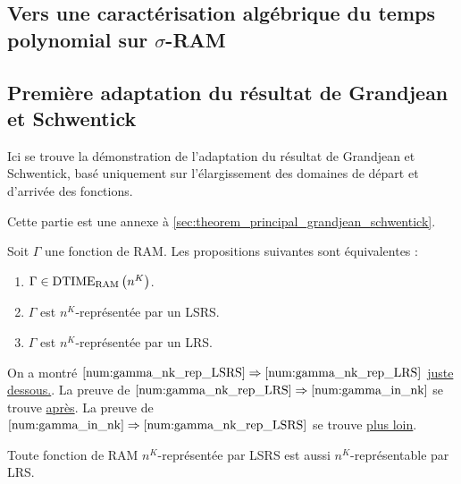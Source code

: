 \begin{appendices}
		
		
	\chapter{Vers une caractérisation algébrique du temps polynomial sur $\sigma$-RAM}
		\label{chap:LSRS}
		
		\section{Première adaptation du résultat de Grandjean et Schwentick}
		\label{sec:LRS_et_temps_poly}
		
		Ici se trouve la démonstration de l'adaptation du résultat de Grandjean et Schwentick, basé uniquement sur l'élargissement des domaines de départ et d'arrivée des fonctions.
		
		Cette partie est une annexe à \ref{sec:theorem_principal_grandjean_schwentick}.
		
		\begin{conj}
			\label{conj:big_theorem}
			Soit $\Gamma$ une fonction de RAM. Les propositions suivantes sont équivalentes :
			
			\begin{enumerate}[itemsep=-1mm]
				\item 	\label{num:gamma_in_nk}
				$\Gamma \in \text{DTIME}_{\text{RAM}}\left( n^{K} \right)$.
				
				\item 	\label{num:gamma_nk_rep_LSRS}
				$\Gamma$ est $n^K$-représentée par un LSRS.
				
				\item	\label{num:gamma_nk_rep_LRS}
				$\Gamma$ est $n^K$-représentée par un LRS.
			\end{enumerate}
		\end{conj}
		
		On a montré $\ref{num:gamma_nk_rep_LSRS} \Rightarrow \ref{num:gamma_nk_rep_LRS}$ \hyperref[conj:rep_LSRS_rep_LRS]{juste dessous.}. 
		La preuve de $\ref{num:gamma_nk_rep_LRS} \Rightarrow \ref{num:gamma_in_nk}$ se trouve \hyperref[conj:rep_LRS_calc_n_K]{après}.
		La preuve de $\ref{num:gamma_in_nk} \Rightarrow \ref{num:gamma_nk_rep_LSRS}$ se trouve \hyperref[conj:poly_implique_LSRS]{plus loin}.
		
		
		\begin{conj}
			\label{conj:rep_LSRS_rep_LRS}
			Toute fonction de RAM $n^K$-représentée par LSRS est aussi $n^K$-représentable par LRS.
		\end{conj}
		

\end{appendices}
